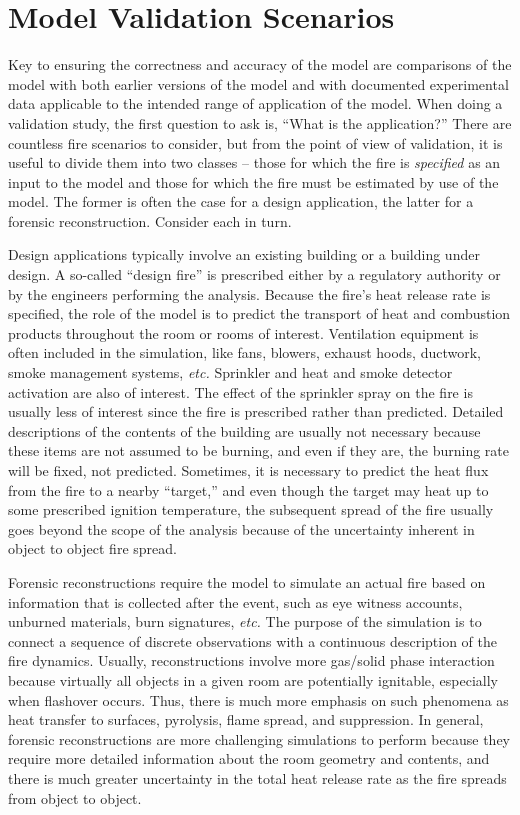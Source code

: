 \section{Model Validation Scenarios}

Key to ensuring the correctness and accuracy of the model are comparisons of the model with both earlier versions of the model and with documented experimental data applicable to the intended range of application of the model. When doing a validation study, the first question to ask is, ``What is the application?'' There are countless fire scenarios to consider, but from the point of view of validation, it is useful to divide them into two classes -- those for which the fire is {\em specified} as an input to the model and those for which the fire must be estimated by use of the model. The former is often the case for a design application, the latter for a forensic reconstruction. Consider each in turn.

Design  applications  typically  involve  an existing  building  or  a building  under  design. A  so-called  ``design  fire'' is  prescribed either by  a regulatory authority  or by the engineers  performing the analysis. Because the  fire's heat release rate is  specified, the role of the model is to predict  the transport of heat and combustion products throughout  the room or  rooms of  interest. Ventilation  equipment is often included  in the simulation, like fans,  blowers, exhaust hoods, ductwork,  smoke management systems,  {\em etc.} Sprinkler  and heat and smoke detector activation are also of interest.  The effect of the sprinkler spray on the fire is usually less of interest since the fire is  prescribed rather  than  predicted. Detailed  descriptions of  the contents of the building are usually not necessary because these items are not assumed to be burning,  and even if they are, the burning rate will be  fixed, not predicted.  Sometimes, it is necessary  to predict the heat  flux from the fire  to a nearby ``target,''  and even though the target  may heat up  to some prescribed ignition  temperature, the subsequent spread  of the  fire usually goes  beyond the scope  of the analysis because of the uncertainty  inherent in object to object fire spread.

Forensic reconstructions require the  model to simulate an actual fire based on  information that is collected  after the event,  such as eye witness accounts, unburned materials,  burn signatures, {\em etc.} The purpose  of  the simulation  is  to  connect  a sequence  of  discrete observations  with  a continuous  description  of  the fire  dynamics. Usually,  reconstructions  involve  more gas/solid  phase  interaction because  virtually  all  objects  in  a  given  room  are  potentially ignitable, especially when flashover  occurs. Thus, there is much more emphasis on  such phenomena as  heat transfer to  surfaces, pyrolysis, flame  spread, and suppression.  In general,  forensic reconstructions are more challenging simulations  to perform because they require more detailed  information  about the  room  geometry and contents,  and  there is  much greater uncertainty in the total heat release rate as the fire spreads from object to object.

